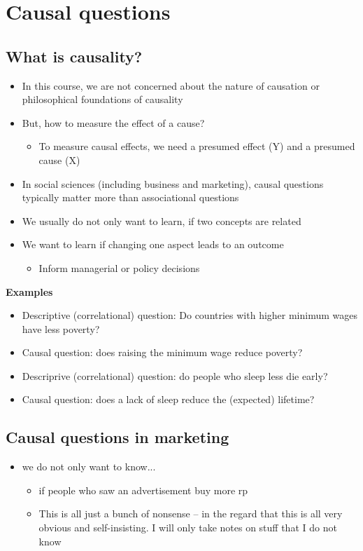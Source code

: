 \documentclass[10pt]{article}
\begin{document}
\section{Causal questions}
\subsection{What is causality?}
\begin{itemize}
    \item In this course, we are not concerned about the nature of causation or philosophical foundations of causality 
    \item But, how to measure the effect of a cause? 
    \begin{itemize}
        \item To measure causal effects, we need a presumed effect (Y) and a presumed cause (X)
    \end{itemize}
    \item In social sciences (including business and marketing), causal questions typically matter more than associational questions 
    \item We usually do not only want to learn, if two concepts are related 
    \item We want to learn if changing one aspect leads to an outcome
    \begin{itemize}
        \item Inform managerial or policy decisions
    \end{itemize}
\end{itemize}
\textbf{Examples}
\begin{itemize}
    \item Descriptive (correlational) question: Do countries with higher minimum wages have less poverty?
    \item Causal question: does raising the minimum wage reduce poverty?
    \item Descriprive (correlational) question: do people who sleep less die early?
    \item Causal question: does a lack of sleep reduce the (expected) lifetime?
\end{itemize}
\newpage 
\subsection{Causal questions in marketing}
\begin{itemize}
    \item we do not only want to know... 
    \begin{itemize}
        \item if people who saw an advertisement buy more rp
        \item This is all just a bunch of nonsense – in the regard that this is all very obvious and self-insisting. I will only take notes on stuff that I do not know 
    \end{itemize}
\end{itemize}
\end{document}
